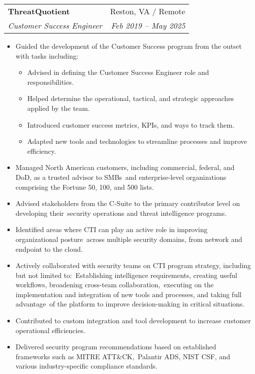 \documentclass[letterpaper,11pt]{article}
\makeatletter
\newcommand{\resumeSubheading}[4]{
  \vspace{-1pt}\item
    \begin{tabular*}{0.97\textwidth}[t]{l@{\extracolsep{\fill}}r}
      \textbf{#1} & #2 \\
      \textit{\small#3} & \textit{\small #4} \\
    \end{tabular*}\vspace{-5pt}
}
\newcommand{\resumeItemListStart}{\begin{itemize}[nosep]}
\newcommand{\resumeItemListEnd}{\end{itemize}\vspace{-5pt}}
\makeatother
\begin{document}
\resumeSubheading
{ThreatQuotient}{Reston, VA / Remote}
{Customer Success Engineer}{Feb 2019 -- May 2025}
\resumeItemListStart
\item Guided the development of the Customer Success program from the outset with tasks including:
\begin{itemize}[nosep]
  \item Advised in defining the Customer Success Engineer role and responsibilities.
  \item Helped determine the operational, tactical, and strategic approaches applied by the team.
  \item Introduced customer success metrics, KPIs, and ways to track them.
  \item Adapted new tools and technologies to streamline processes and improve efficiency.
\end{itemize}
\item Managed North American customers, including commercial, federal, and DoD, as a trusted advisor to SMBs\
and enterprise-level organizations comprising the Fortune 50, 100, and 500 lists.
\item Advised stakeholders from the C-Suite to the primary contributor level on developing their\
security operations and threat intelligence programs.
\item Identified areas where CTI can play an active role in improving organizational posture\
across multiple security domains, from network and endpoint to the cloud.
\break
\item Actively collaborated with security teams on CTI program strategy, including but not limited to:\
Establishing intelligence requirements, creating useful workflows, broadening cross-team collaboration,\
executing on the implementation and integration of new tools and processes, and taking full advantage\
of the platform to improve decision-making in critical situations.
\item Contributed to custom integration and tool development to increase customer operational efficiencies.
\item Delivered security program recommendations based on established frameworks such as {MITRE ATT\&CK},\
Palantir ADS, NIST CSF, and various industry-specific compliance standards.
\resumeItemListEnd
\end{document}

